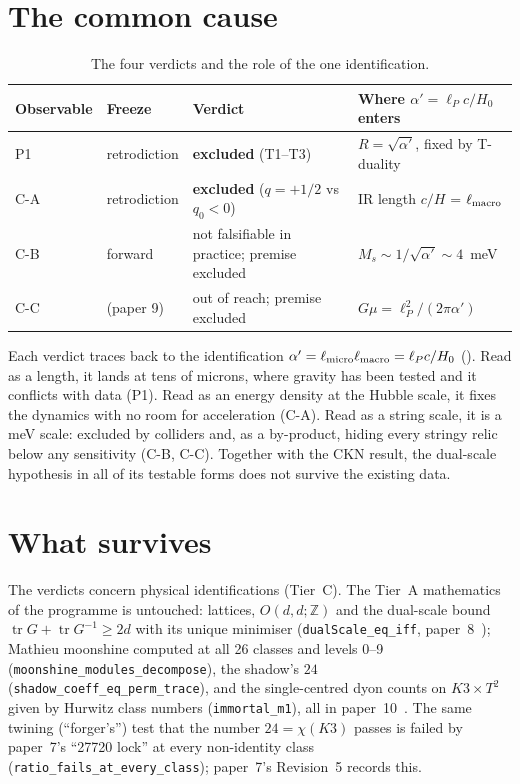 \documentclass[11pt,a4paper]{article}
\theoremstyle{remark}
\newcommand{\lean}[1]{\texttt{#1}}
\begin{document}
\section{The common cause}
\label{sec:cause}

\begin{table}[h]
\centering\small
\begin{tabular}{llp{4.2cm}p{4.6cm}}
\toprule
Observable & Freeze & Verdict & Where $\alpha'=\ell_Pc/H_0$ enters \\
\midrule
P1 & retrodiction & \textbf{excluded} (T1--T3) & $R=\sqrt{\alpha'}$, fixed by T-duality \\
C-A & retrodiction & \textbf{excluded} ($q=+1/2$ vs $q_0<0$) & IR length $c/H$ = $\ell_{\rm macro}$ \\
C-B & forward & not falsifiable in practice; premise excluded & $M_s\sim1/\sqrt{\alpha'}\sim4$~meV \\
C-C & (paper 9) & out of reach; premise excluded & $G\mu=\ell_P^2/(2\pi\alpha')$ \\
\bottomrule
\end{tabular}
\caption{The four verdicts and the role of the one identification.}
\label{tab:verdicts}
\end{table}

Each verdict traces back to the identification $\alpha'=\ell_{\rm micro}\ell_{\rm macro}=\ell_P c/H_0$
(). Read as a length, it lands at tens of microns, where gravity has been tested and
it conflicts with data (P1). Read as an energy density at the Hubble scale, it fixes the dynamics
with no room for acceleration (C-A). Read as a string scale, it is a meV scale: excluded by colliders and, as a
by-product, hiding every stringy relic below any sensitivity (C-B, C-C). Together with the CKN result, the
dual-scale hypothesis in all of its testable forms does not survive the existing data.

\section{What survives}
\label{sec:survives}

The verdicts concern physical identifications (Tier~C). The Tier~A mathematics of the programme is untouched:
lattices, $O(d,d;\mathbb Z)$ and the dual-scale bound $\operatorname{tr}G+\operatorname{tr}G^{-1}\ge2d$ with its unique
minimiser (\lean{dualScale\_eq\_iff}, paper~8~\cite{Callens2026Paper8}); Mathieu moonshine computed at all 26 classes
and levels 0--9 (\lean{moonshine\_modules\_decompose}), the shadow's $24$ (\lean{shadow\_coeff\_eq\_perm\_trace}), and the
single-centred dyon counts on $K3\times T^2$ given by Hurwitz class numbers (\lean{immortal\_m1}), all in
paper~10~\cite{Callens2026Paper10}. The same twining (``forger's'') test that the number $24=\chi(K3)$ passes is
failed by paper~7's ``27720 lock'' at every non-identity class (\lean{ratio\_fails\_at\_every\_class}); paper~7's
Revision~5 records this.
\end{document}

